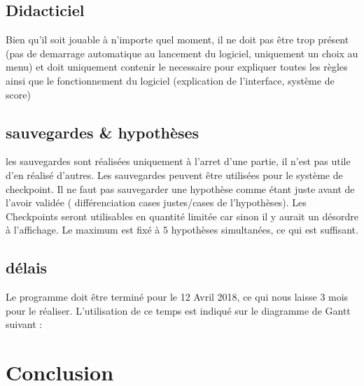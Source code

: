 \documentclass{report}
\begin{document}
	\section{Didacticiel}
		Bien qu'il soit jouable à n'importe quel moment, il ne doit pas être trop présent (pas de demarrage automatique au lancement du logiciel, uniquement un choix au menu) et doit uniquement contenir le necessaire pour expliquer toutes les règles ainsi que le fonctionnement du logiciel (explication de l'interface, système de score)
	
	\section{sauvegardes \& hypothèses}
		les sauvegardes sont réalisées uniquement à l'arret d'une partie, il n'est pas utile d'en réalisé d'autres. Les sauvegardes peuvent être utilisées pour le système de checkpoint. Il ne faut pas sauvegarder une hypothèse comme étant juste avant de l'avoir validée ( différenciation cases justes/cases de l'hypothèses). Les Checkpoints seront utilisables en quantité limitée car sinon il y aurait un désordre à l'affichage. Le maximum est fixé à 5 hypothèses simultanées, ce qui est suffisant.
		
	
	\section{délais}
		Le programme doit être terminé pour le 12 Avril 2018, ce qui nous laisse 3 mois pour le réaliser. L'utilisation de ce temps est indiqué sur le diagramme de Gantt suivant :
		
		
		
\chapter{Conclusion}
		
		
\end{document}
